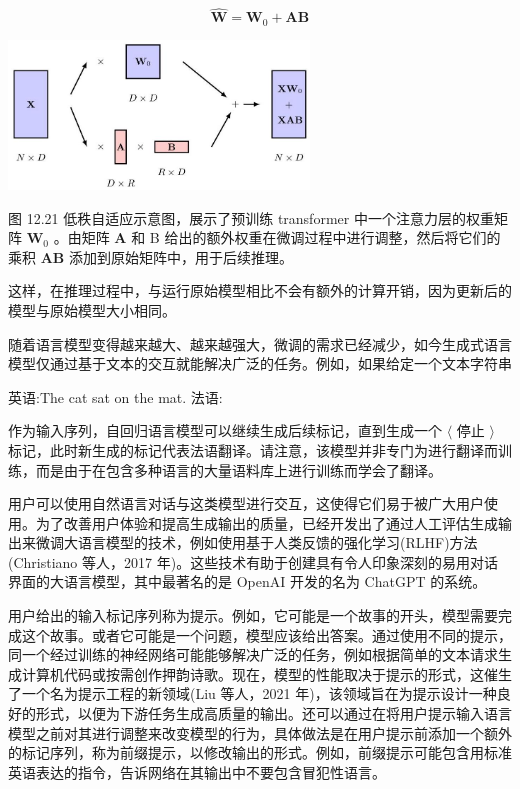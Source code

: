 \documentclass[10pt]{report}
\begin{document}
\[
\widehat{\mathbf{W}} = {\mathbf{W}}_{0} + \mathbf{{AB}} \tag{12.36}
\]

\begin{center}
\includegraphics[max width=0.6\textwidth]{images/0194e279-9b28-703a-88f4-c3ac21e2010d_412_619_345_853_424_0.jpg}
\end{center}
\hspace*{3em} 

图 12.21 低秩自适应示意图，展示了预训练 transformer 中一个注意力层的权重矩阵 \({\mathbf{W}}_{0}\) 。由矩阵 \(\mathbf{A}\) 和 B 给出的额外权重在微调过程中进行调整，然后将它们的乘积 \(\mathbf{{AB}}\) 添加到原始矩阵中，用于后续推理。

这样，在推理过程中，与运行原始模型相比不会有额外的计算开销，因为更新后的模型与原始模型大小相同。

随着语言模型变得越来越大、越来越强大，微调的需求已经减少，如今生成式语言模型仅通过基于文本的交互就能解决广泛的任务。例如，如果给定一个文本字符串

英语:The cat sat on the mat. 法语:

作为输入序列，自回归语言模型可以继续生成后续标记，直到生成一个 \(\langle\) 停止 \(\rangle\) 标记，此时新生成的标记代表法语翻译。请注意，该模型并非专门为进行翻译而训练，而是由于在包含多种语言的大量语料库上进行训练而学会了翻译。

用户可以使用自然语言对话与这类模型进行交互，这使得它们易于被广大用户使用。为了改善用户体验和提高生成输出的质量，已经开发出了通过人工评估生成输出来微调大语言模型的技术，例如使用基于人类反馈的强化学习(RLHF)方法(Christiano 等人，2017 年)。这些技术有助于创建具有令人印象深刻的易用对话界面的大语言模型，其中最著名的是 OpenAI 开发的名为 ChatGPT 的系统。

用户给出的输入标记序列称为提示。例如，它可能是一个故事的开头，模型需要完成这个故事。或者它可能是一个问题，模型应该给出答案。通过使用不同的提示，同一个经过训练的神经网络可能能够解决广泛的任务，例如根据简单的文本请求生成计算机代码或按需创作押韵诗歌。现在，模型的性能取决于提示的形式，这催生了一个名为提示工程的新领域(Liu 等人，2021 年)，该领域旨在为提示设计一种良好的形式，以便为下游任务生成高质量的输出。还可以通过在将用户提示输入语言模型之前对其进行调整来改变模型的行为，具体做法是在用户提示前添加一个额外的标记序列，称为前缀提示，以修改输出的形式。例如，前缀提示可能包含用标准英语表达的指令，告诉网络在其输出中不要包含冒犯性语言。
\end{document}
